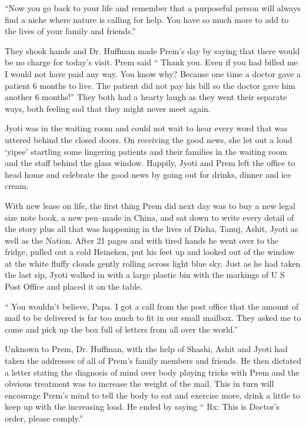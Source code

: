 ``Now you go back to your life and remember that a purposeful person
will always find a niche where nature is calling for help. You have so
much more to add to the lives of your family and friends.''

They shook hands and Dr. Huffman made Prem's day by saying that there
would be no charge for today's visit. Prem said `` Thank you. Even if
you had billed me I would not have paid any way. You know why? Because
one time a doctor gave a patient 6 months to live. The patient did not
pay his bill so the doctor gave him another 6 months!'' They both had a
hearty laugh as they went their separate ways, both feeling sad that
they might never meet again.

Jyoti was in the waiting room and could not wait to hear every word that
was uttered behind the closed doors. On receiving the good news, she let
out a loud `yipee' startling some lingering patients and their families
in the waiting room and the staff behind the glass window. Happily,
Jyoti and Prem left the office to head home and celebrate the good news
by going out for drinks, dinner and ice cream.

With new lease on life, the first thing Prem did next day was to buy a
new legal size note book, a new pen--made in China, and sat down to
write every detail of the story plus all that was happening in the lives
of Disha, Tanuj, Ashit, Jyoti as well as the Nation. After 21 pages and
with tired hands he went over to the fridge, pulled out a cold Heineken,
put his feet up and looked out of the window at the white fluffy clouds
gently rolling across light blue sky. Just as he had taken the last sip,
Jyoti walked in with a large plastic bin with the markings of U S Post
Office and placed it on the table.

`` You wouldn't believe, Papa. I got a call from the post office that
the amount of mail to be delivered is far too much to fit in our small
mailbox. They asked me to come and pick up the box full of letters from
all over the world.''

Unknown to Prem, Dr. Huffman, with the help of Shashi, Ashit and Jyoti
had taken the addresses of all of Prem's family members and friends. He
then dictated a letter stating the diagnosis of mind over body playing
tricks with Prem and the obvious treatment was to increase the weight of
the mail. This in turn will encourage Prem's mind to tell the body to
eat and exercise more, drink a little to keep up with the increasing
load. He ended by saying `` Rx: This is Doctor's order, please comply.''

